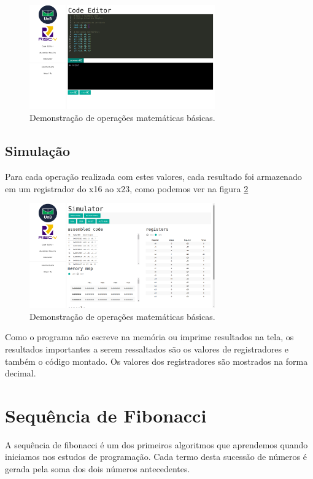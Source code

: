 	\begin{figure}[h]
	  \centering
	  \includegraphics[width=8cm]{img/aritmetica_codigo.png}
	  \caption{Demonstração de operações matemáticas básicas.}
	  \label{fig:operacoes_matematicas_codigo}
	\end{figure}


\subsection{Simulação}
	
	Para cada operação realizada com estes valores, cada resultado foi armazenado em um registrador do x16 ao x23, como podemos ver na figura \ref{fig:operacoes_matematicas_resultados}

	\begin{figure}[h]
	  \centering
	  \includegraphics[width=8cm]{img/aritmetica_results.png}
	  \caption{Demonstração de operações matemáticas básicas.}
	  \label{fig:operacoes_matematicas_resultados}
	\end{figure}

	Como o programa não escreve na memória ou imprime resultados na tela, os resultados importantes a serem ressaltados são os valores de registradores e também o código montado. Os valores dos registradores são mostrados na forma decimal.


\section{Sequência de Fibonacci}
	
	A sequência de fibonacci é um dos primeiros algoritmos que aprendemos quando iniciamos nos estudos de programação. Cada termo desta sucessão de números é gerada pela soma dos dois números antecedentes.

